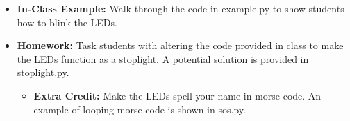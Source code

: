 \begin{enumerate}
        \begin{itemize}
            \item \textbf{In-Class Example:} Walk through the code 
            in example.py to show students how to blink the LEDs. 
            \item \textbf{Homework:} Task students with altering 
            the code provided in class to make the LEDs function 
            as a stoplight. A potential solution is provided in 
            stoplight.py.
            \begin{itemize}
                \item \textbf{Extra Credit:} Make the LEDs spell 
                your name in morse code. An example of looping morse
                code is shown in sos.py.
            \end{itemize}
        \end{itemize}
\end{enumerate}

